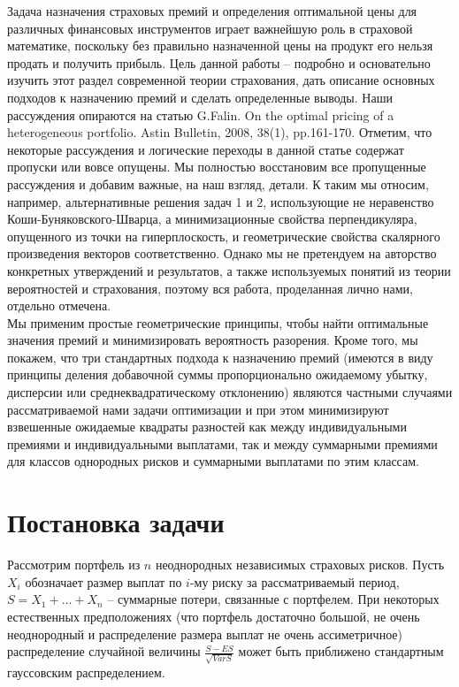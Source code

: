 \documentclass[12pt,a4paper]{article}
\begin{document}
Задача назначения страховых премий и определения оптимальной цены для различных финансовых инструментов играет важнейшую роль в страховой 
математике, поскольку без правильно назначенной цены на продукт  его нельзя продать и получить прибыль. Цель данной работы -- подробно  и основательно изучить этот раздел современной теории страхования,   дать описание  основных подходов к назначению премий и сделать определенные выводы. Наши рассуждения опираются на статью G.Falin. On the optimal pricing of a heterogeneous portfolio. Astin Bulletin, 2008, 38(1), pp.161-170.  Отметим, что  некоторые рассуждения  и логические переходы в данной статье содержат пропуски или вовсе опущены. Мы полностью восстановим все пропущенные рассуждения и добавим важные, на наш взгляд, детали. К таким мы относим, например, альтернативные решения задач 1 и 2,  использующие  не неравенство Коши-Буняковского-Шварца, а минимизационные  свойства перпендикуляра, опущенного из точки на гиперплоскость, и  геометрические свойства скалярного произведения векторов соответственно.
Однако мы не претендуем на авторство конкретных утверждений и результатов, а также используемых понятий из теории вероятностей и страхования, поэтому вся работа, проделанная лично нами,  отдельно отмечена.  \\
Мы применим простые геометрические принципы, чтобы найти оптимальные значения премий и минимизировать вероятность разорения. Кроме того, мы покажем, что три стандартных подхода  к назначению премий (имеются в виду принципы деления добавочной суммы пропорционально ожидаемому убытку, дисперсии или среднеквадратическому отклонению) являются частными случаями рассматриваемой нами задачи  оптимизации и при этом  минимизируют  взвешенные  ожидаемые квадраты разностей  как между индивидуальными премиями и индивидуальными выплатами,   так и между суммарными премиями для классов однородных рисков и суммарными выплатами по этим классам. \\


 \section{ Постановка задачи }
 
Рассмотрим портфель из $n$ неоднородных независимых страховых рисков. Пусть  $X_{i} $  обозначает размер выплат по  $i$-му риску за рассматриваемый период, 
$S = X_{1} + \dots + X_{n} $ -- суммарные потери, связанные с портфелем. При некоторых естественных предположениях (что портфель достаточно большой, не очень неоднородный и распределение размера выплат не очень ассиметричное) распределение случайной величины $\frac{S-ES}{\sqrt{VarS}}$ может быть приближено стандартным гауссовским распределением.\\
\end{document}
